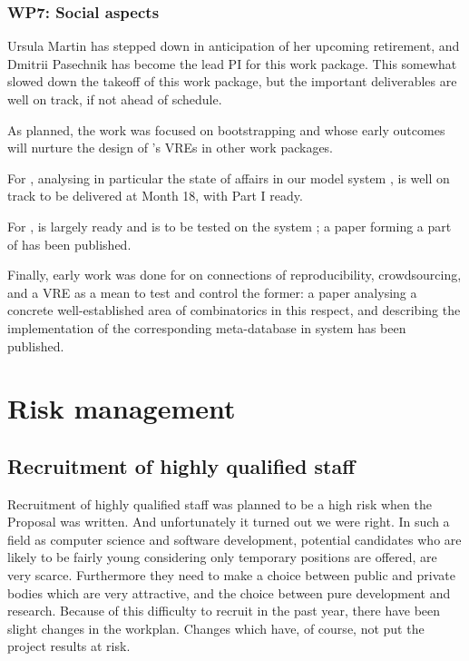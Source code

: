\documentclass{deliverablereport}
\begin{document}
\subsubsection{WP7: Social aspects}

Ursula Martin has stepped down in anticipation of her upcoming retirement, and Dmitrii Pasechnik has
become the lead PI for this work package.
This somewhat slowed down the takeoff of this work package, but the
important deliverables are well on track, if not ahead of schedule.

As planned, the work was focused on bootstrapping
 and
 whose early
outcomes will nurture the design of \ODK's VREs in other work
packages.

For ,
 analysing in
particular the state of affairs in our model system \Sage, is well on
track to be delivered at Month 18, with Part I ready.

For ,
 is largely ready and is to
be tested on the system \Sage; a paper
\cite{Pavlou:2016:MCI:2936924.2936934} forming a part of
 has been published.

Finally, early work was done for
 on connections of
reproducibility, crowdsourcing, and a VRE as a mean to test and
control the former: a paper \cite{2016arXiv160100181C} analysing a
concrete well-established area of combinatorics in this respect, and
describing the implementation of the corresponding meta-database in
\Sage system has been published.

\section{Risk management}
\subsection{Recruitment of highly qualified staff}
 Recruitment of highly qualified staff was planned to be a high risk when the Proposal was written. And unfortunately it turned out we were right. In such a field as computer science and software development, potential candidates who are likely to be fairly young considering only temporary positions are offered, are very scarce. Furthermore they need to make a choice between public and private bodies which are very attractive, and the choice between pure development and research.
Because of this difficulty to recruit in the past year, there have been slight changes in the workplan. Changes which have, of course, not put the project results at risk.
\end{document}
